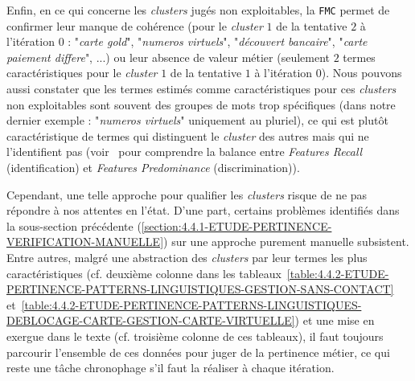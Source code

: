 			Enfin, en ce qui concerne les \textit{clusters} jugés non exploitables, la \texttt{FMC} permet de confirmer leur manque de cohérence (pour le \textit{cluster} $1$ de la tentative $2$ à l'itération $0$ : "\textit{carte gold}", "\textit{numeros virtuels}", "\textit{découvert bancaire}", "\textit{carte paiement differe}", ...) ou leur absence de valeur métier (seulement $2$ termes caractéristiques pour le \textit{cluster} $1$ de la tentative $1$ à l'itération $0$).
			Nous pouvons aussi constater que les termes estimés comme caractéristiques pour ces \textit{clusters} non exploitables sont souvent des groupes de mots trop spécifiques (dans notre dernier exemple : "\textit{numeros virtuels}" uniquement au pluriel), ce qui est plutôt caractéristique de termes qui distinguent le \textit{cluster} des autres mais qui ne l'identifient pas (voir~\cite{lamirel-etal:2017:novel-approach-feature} pour comprendre la balance entre \textit{Features Recall} (identification) et \textit{Features Predominance} (discrimination)).
			
			Cependant, une telle approche pour qualifier les \textit{clusters} risque de ne pas répondre à nos attentes en l'état.
			D'une part, certains problèmes identifiés dans la sous-section précédente (\ref{section:4.4.1-ETUDE-PERTINENCE-VERIFICATION-MANUELLE}) sur une approche purement manuelle subsistent.
			Entre autres, malgré une abstraction des \textit{clusters} par leur termes les plus caractéristiques (cf. deuxième colonne dans les tableaux~\ref{table:4.4.2-ETUDE-PERTINENCE-PATTERNS-LINGUISTIQUES-GESTION-SANS-CONTACT} et~\ref{table:4.4.2-ETUDE-PERTINENCE-PATTERNS-LINGUISTIQUES-DEBLOCAGE-CARTE-GESTION-CARTE-VIRTUELLE}) et une mise en exergue dans le texte (cf. troisième colonne de ces tableaux), il faut toujours parcourir l'ensemble de ces données pour juger de la pertinence métier, ce qui reste une tâche chronophage s'il faut la réaliser à chaque itération.
			
